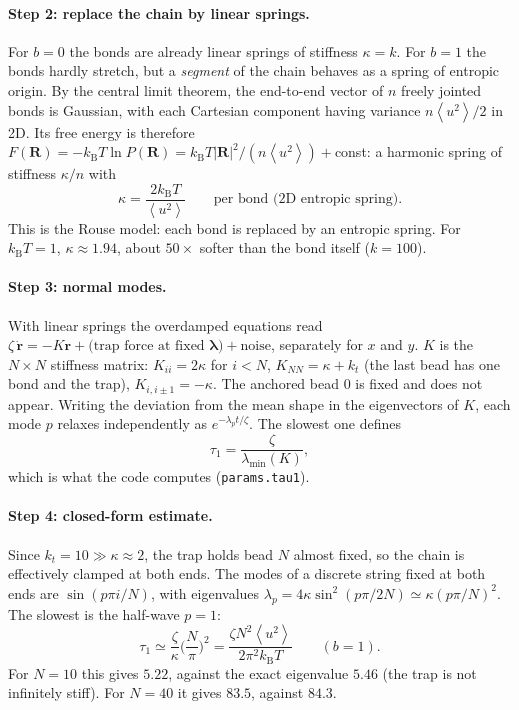\documentclass[11pt,a4paper]{article}
\newcommand{\kT}{k_{\mathrm B}T}
\newcommand{\avg}[1]{\left\langle #1\right\rangle}
\newcommand{\lam}{\bm{\lambda}}
\begin{document}
\paragraph{Step 2: replace the chain by linear springs.} For $b=0$ the bonds are already linear springs
of stiffness $\kappa=k$. For $b=1$ the bonds hardly stretch, but a \emph{segment} of the chain behaves as
a spring of entropic origin. By the central limit theorem, the end-to-end vector of $n$ freely jointed
bonds is Gaussian, with each Cartesian component having variance $n\avg{u^2}/2$ in 2D. Its free
energy is therefore $F(\bm R)=-\kT\ln P(\bm R)=\kT|\bm R|^2/(n\avg{u^2})+$const: a harmonic spring of stiffness
$\kappa/n$ with
\begin{equation}
\kappa=\frac{2\kT}{\avg{u^2}}\qquad\text{per bond (2D entropic spring)}.
\end{equation}
This is the Rouse model: each bond is replaced by an entropic spring. For $\kT=1$, $\kappa\approx1.94$,
about $50\times$ softer than the bond itself ($k=100$).

\paragraph{Step 3: normal modes.} With linear springs the overdamped equations read
$\zeta\,\dot{\bm r}=-K\bm r+\text{(trap force at fixed }\lam)+\text{noise}$, separately for $x$ and $y$.
$K$ is the $N\times N$ stiffness matrix: $K_{ii}=2\kappa$ for $i<N$, $K_{NN}=\kappa+k_t$ (the last bead
has one bond and the trap), $K_{i,i\pm1}=-\kappa$. The anchored bead $0$ is fixed and does not appear.
Writing the deviation from the mean shape in the eigenvectors of $K$, each mode $p$ relaxes
independently as $e^{-\lambda_pt/\zeta}$. The slowest one defines
\begin{equation}
\tau_1=\frac{\zeta}{\lambda_{\min}(K)} ,
\end{equation}
which is what the code computes (\texttt{params.tau1}).

\paragraph{Step 4: closed-form estimate.} Since $k_t=10\gg\kappa\approx2$, the trap holds bead $N$ almost fixed,
so the chain is effectively clamped at both ends. The modes of a discrete string fixed at both ends are
$\sin(p\pi i/N)$, with eigenvalues $\lambda_p=4\kappa\sin^2(p\pi/2N)\simeq\kappa(p\pi/N)^2$. The slowest is
the half-wave $p=1$:
\begin{equation}
\tau_1\simeq\frac{\zeta}{\kappa}\Big(\frac{N}{\pi}\Big)^2=\frac{\zeta N^2\avg{u^2}}{2\pi^2\kT}
\qquad(b=1).
\label{eq:rouse}
\end{equation}
For $N=10$ this gives $5.22$, against the exact eigenvalue $5.46$ (the trap is not infinitely stiff).
For $N=40$ it gives $83.5$, against $84.3$.
\end{document}
